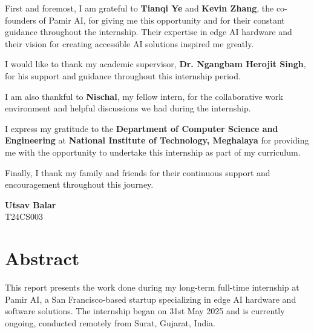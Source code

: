 \documentclass[12pt,a4paper]{report}
\begin{document}
\vspace{0.5cm}

First and foremost, I am grateful to \textbf{Tianqi Ye} and \textbf{Kevin Zhang}, the co-founders of Pamir AI, for giving me this opportunity and for their constant guidance throughout the internship. Their expertise in edge AI hardware and their vision for creating accessible AI solutions inspired me greatly.

\vspace{0.5cm}

I would like to thank my academic supervisor, \textbf{Dr. Ngangbam Herojit Singh}, for his support and guidance throughout this internship period.

\vspace{0.5cm}

I am also thankful to \textbf{Nischal}, my fellow intern, for the collaborative work environment and helpful discussions we had during the internship.

\vspace{0.5cm}

I express my gratitude to the \textbf{Department of Computer Science and Engineering} at \textbf{National Institute of Technology, Meghalaya} for providing me with the opportunity to undertake this internship as part of my curriculum.

\vspace{0.5cm}

Finally, I thank my family and friends for their continuous support and encouragement throughout this journey.

\vspace{2cm}

\begin{flushright}
\textbf{Utsav Balar} \\
T24CS003
\end{flushright}

\newpage
\chapter*{Abstract}

\vspace{1cm}

This report presents the work done during my long-term full-time internship at Pamir AI, a San Francisco-based startup specializing in edge AI hardware and software solutions. The internship began on 31st May 2025 and is currently ongoing, conducted remotely from Surat, Gujarat, India.
\end{document}
